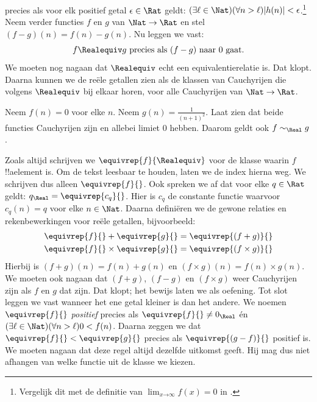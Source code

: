 \documentclass[../../../include/open-logic-section]{subfiles}
\begin{document}
precies als voor elk positief getal $\epsilon \in \Rat$ geldt:
$(\exists \ell \in \Nat)(\forall n > \ell)|h(n)| <
\epsilon$.\footnote{Vergelijk dit met de definitie van $\lim_{x
\mathord{\rightarrow}\infty}f(x) = 0$ in
.} Neem verder functies $f$ en $g$ van
$\Nat \to \Rat$ en stel $(f-g)(n) = f(n) - g(n)$. Nu leggen we vast:
\[
	f \Realequiv g \text{ precies als $(f-g)$ naar $0$ gaat}.
\]
We moeten nog nagaan dat $\Realequiv$ echt een equivalentierelatie is.
Dat klopt. Daarna kunnen we de reële getallen zien als de klassen van
Cauchyrijen die volgens $\Realequiv$ bij elkaar horen, voor alle
Cauchyrijen van $\Nat \to \Rat$.
\begin{prob}
Neem $f(n) = 0$ voor elke $n$. Neem $g(n) = \frac{1}{(n+1)^2}$. Laat
zien dat beide functies Cauchyrijen zijn en allebei limiet $0$ hebben.
Daarom geldt ook $f \sim_\Real g$.
\end{prob}
Zoals altijd schrijven we $\equivrep{f}{\Realequiv}$ voor de klasse
waarin $f$ !!a{element} is. Om de tekst leesbaar te houden, laten we de
index hierna weg. We schrijven dus alleen $\equivrep{f}{}$. Ook spreken
we af dat voor elke $q \in \Rat$ geldt: $q_{\Real} =
\equivrep{c_{q}}{}$. Hier is $c_{q}$ de constante functie waarvoor
$c_q(n) = q$ voor elke $n \in \Nat$. Daarna definiëren we de gewone
relaties en rekenbewerkingen voor reële getallen, bijvoorbeeld:
\begin{align*}
	\equivrep{f}{} + \equivrep{g}{} &= 	\equivrep{(f + g)}{} \\
	\equivrep{f}{} \times 	\equivrep{g}{} &= \equivrep{(f \times g)}{} 
\end{align*}
Hierbij is $(f + g)(n) = f(n) + g(n)$ en $(f \times g)(n) = f(n)
\times g(n)$. We moeten ook nagaan dat $(f + g)$, $(f-g)$ en $(f\times
g)$ weer Cauchyrijen zijn als $f$ en $g$ dat zijn. Dat klopt; het
bewijs laten we als oefening.
Tot slot leggen we vast wanneer het ene getal kleiner is dan het andere. We noemen $\equivrep{f}{}$
\emph{positief} precies als $\equivrep{f}{}\neq 0_\Real$ én $(\exists
\ell \in \Nat)(\forall n > \ell)0 < f(n)$. Daarna zeggen we dat
$\equivrep{f}{} < \equivrep{g}{}$ precies als $\equivrep{(g - f)}{}$
positief is. We moeten nagaan dat deze regel altijd dezelfde uitkomst
geeft. Hij mag dus niet afhangen van welke functie uit de klasse we kiezen.
\end{document}
